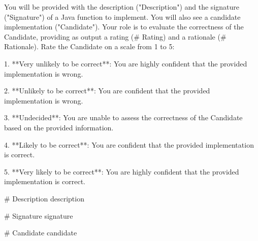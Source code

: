 You will be provided with the description ("Description") and the signature ("Signature") of a Java function to implement. You will also see a candidate implementation ("Candidate"). Your role is to evaluate the correctness of the Candidate, providing as output a rating (# Rating) and a rationale (# Rationale). Rate the Candidate on a scale from 1 to 5:

1. **Very unlikely to be correct**: You are highly confident that the provided implementation is wrong. 

2. **Unlikely to be correct**:  You are confident that the provided implementation is wrong. 

3. **Undecided**: You are unable to assess the correctness of the Candidate based on the provided information.

4. **Likely to be correct**: You are confident that the provided implementation is correct. 

5. **Very likely to be correct**: You are highly confident that the provided implementation is correct. 

# Description
{description}

# Signature
{signature}

# Candidate
{candidate}